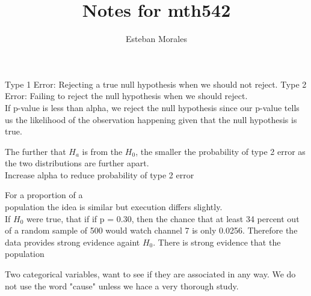 \documentclass[12pt]{article}
\newenvironment{statement}[2][Section]{\begin{trivlist}
\item[\hskip \labelsep {\bfseries #1}\hskip \labelsep {\bfseries #2.}]}{\end{trivlist}}
\begin{document}
 
%
%
 
\title{Notes for mth542} %
\author{Esteban Morales} %
\maketitle


\begin{statement}{testing of hypothesis for a population mean} %
Type 1 Error: Rejecting a true null hypothesis when we should not reject.
Type 2 Error: Failing to reject the null hypothesis when we should reject.\\

If p-value is less than alpha, we reject the null hypothesis since our p-value tells us the likelihood of the observation happening given that the null hypothesis is true.


The further that $H_a$ is from the $H_0$, the smaller the probability of type 2 error as the two distributions are further apart.\\
Increase alpha to reduce probability of type 2 error



\end{statement}


\begin{statement}{testing hypothesis for a population proportion}
For a proportion of a \\
population the idea is similar but execution differs slightly.\\

If $H_0$ were true, that if if p = 0.30, then the chance that at least 34 percent out of a random sample of 500 would watch channel 7 is only 0.0256.
Therefore the data provides strong evidence againt $H_0$. There is strong evidence that the population 

\end{statement}

\begin{statement}{Relationship between two categorical data}
Two categorical variables, want to see if they are associated in any way. We do not use the word "cause" unless we hace a very thorough study.


\end{statement}



 
\end{document}

